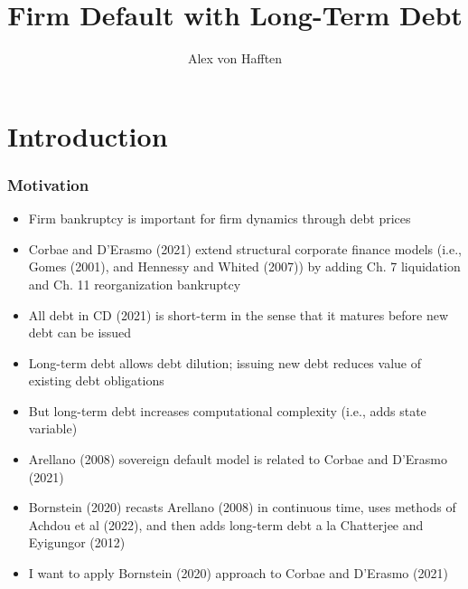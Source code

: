 \documentclass[usenames,dvipsnames, handout, aspectratio=169]{beamer}
\title[Firm Default with Long-Term Debt]{Firm Default with Long-Term Debt}
\author{Alex von Hafften}
\institute{UW-Madison}
\begin{document}
\begin{frame}
\titlepage
\end{frame}

\section{Introduction}

\begin{frame}[label = motivation]
\frametitle{Motivation}
\small
\begin{itemize}
\item Firm bankruptcy is important for firm dynamics through debt prices

\item Corbae and D'Erasmo (2021) extend structural corporate finance models {\color{gray}(i.e., Gomes (2001), and Hennessy and Whited (2007))} by adding Ch. 7 liquidation and Ch. 11 reorganization bankruptcy

\item All debt in CD (2021) is short-term in the sense that it matures before new debt can be issued

\item Long-term debt allows debt dilution; issuing new debt reduces value of existing debt obligations

\item But long-term debt increases computational complexity {\color{gray}(i.e., adds state variable)}

\item Arellano (2008) sovereign default model is related to Corbae and D'Erasmo (2021) \hyperlink{equilibirum_default_models}{}

\item Bornstein (2020) recasts Arellano (2008) in continuous time, uses methods of Achdou et al (2022), and then adds long-term debt a la Chatterjee and Eyigungor (2012)

\item I want to apply Bornstein (2020) approach to Corbae and D'Erasmo (2021)
\end{itemize}
\end{frame}
\end{document}
